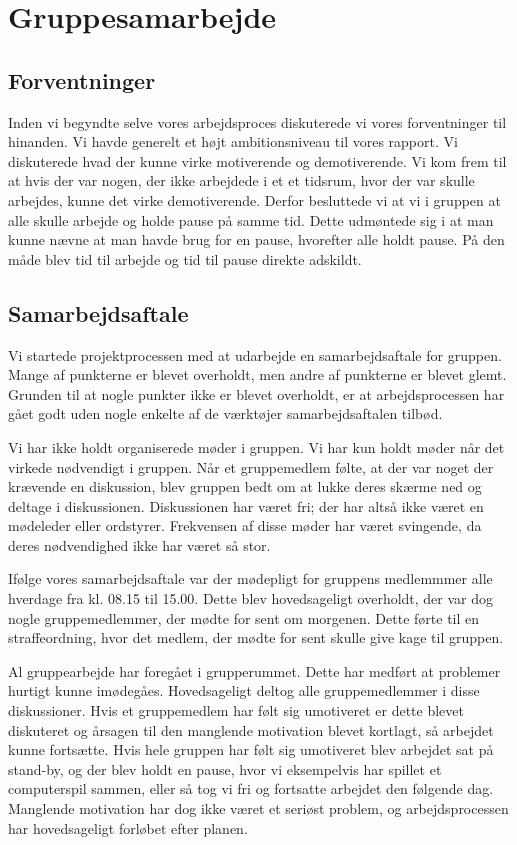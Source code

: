 \section{Gruppesamarbejde}

\subsection{Forventninger}
Inden vi begyndte selve vores arbejdsproces diskuterede vi vores forventninger til hinanden. Vi havde generelt et h\o{}jt ambitionsniveau til vores rapport. 
Vi diskuterede hvad der kunne virke motiverende og demotiverende. Vi kom frem til at hvis der var nogen, der ikke arbejdede i et et tidsrum, hvor der var skulle arbejdes, kunne det virke demotiverende.
Derfor besluttede vi at vi i gruppen at alle skulle arbejde og holde pause p\aa{} samme tid. Dette udm\o{}ntede sig i at man kunne n\ae{}vne at man havde brug for en pause, hvorefter alle holdt pause. 
P\aa{} den m\aa{}de blev tid til arbejde og tid til pause direkte adskildt.

\subsection{Samarbejdsaftale}
Vi startede projektprocessen med at udarbejde en samarbejdsaftale for gruppen. Mange af punkterne er blevet overholdt, men andre af punkterne er blevet glemt. 
Grunden til at nogle punkter ikke er blevet overholdt, er at arbejdsprocessen har g\aa{}et godt uden nogle enkelte af de v\ae{}rkt\o{}jer samarbejdsaftalen tilb\o{}d.


Vi har ikke holdt organiserede m\o{}der i gruppen. Vi har kun holdt m\o{}der n\aa{}r det virkede n\o{}dvendigt i gruppen. 
N\aa{}r et gruppemedlem f\o{}lte, at der var noget der kr\ae{}vende en diskussion, blev gruppen bedt om at lukke deres sk\ae{}rme ned og deltage i diskussionen. 
Diskussionen har v\ae{}ret fri; der har alts\aa{} ikke v\ae{}ret en m\o{}deleder eller ordstyrer.
Frekvensen af disse m\o{}der har v\ae{}ret svingende, da deres n\o{}dvendighed ikke har v\ae{}ret s\aa{} stor.


If\o{}lge vores samarbejdsaftale var der m\o{}depligt for gruppens medlemmmer alle hverdage fra kl. 08.15 til 15.00. 
Dette blev hovedsageligt overholdt, der var dog nogle gruppemedlemmer, der m\o{}dte for sent om morgenen. 
Dette f\o{}rte til en straffeordning, hvor det medlem, der m\o{}dte for sent skulle give kage til gruppen. 


Al gruppearbejde har foreg\aa{}et i grupperummet. Dette har medf\o{}rt at problemer hurtigt kunne im\o{}deg\aa{}es. 
Hovedsageligt deltog alle gruppemedlemmer i disse diskussioner.
Hvis et gruppemedlem har f\o{}lt sig umotiveret er dette blevet diskuteret og \aa{}rsagen til den manglende motivation blevet kortlagt, s\aa{} arbejdet kunne forts\ae{}tte.
Hvis hele gruppen har f\o{}lt sig umotiveret blev arbejdet sat p\aa{} stand-by, og der blev holdt en pause, hvor vi eksempelvis har spillet et computerspil sammen, eller s\aa{} tog vi fri og fortsatte arbejdet den f\o{}lgende dag.
Manglende motivation har dog ikke v\ae{}ret et seri\o{}st problem, og arbejdsprocessen har hovedsageligt forl\o{}bet efter planen.


